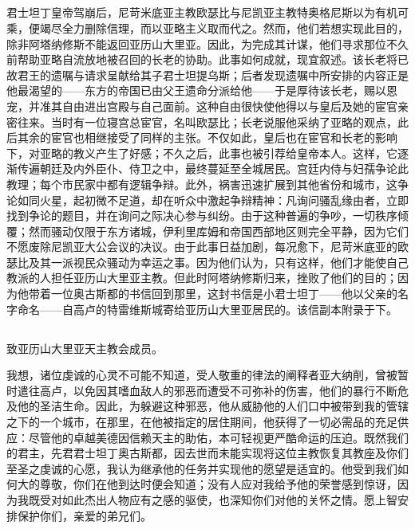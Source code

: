 
\subsection{}

君士坦丁皇帝驾崩后，尼苛米底亚主教欧瑟比与尼凯亚主教特奥格尼斯以为有机可乘，便竭尽全力删除信理，而以亚略主义取而代之。然而，他们若想实现此目的，除非阿塔纳修斯不能返回亚历山大里亚。因此，为完成其计谋，他们寻求那位不久前帮助亚略自流放地被召回的长老的协助。此事如何成就，现宜叙述。该长老将已故君王的遗嘱与请求呈献给其子君士坦提乌斯；后者发现遗嘱中所安排的内容正是他最渴望的——东方的帝国已由父王遗命分派给他——于是厚待该长老，赐以恩宠，并准其自由进出宫殿与自己面前。这种自由很快使他得以与皇后及她的宦官亲密往来。当时有一位寝宫总宦官，名叫欧瑟比；长老说服他采纳了亚略的观点，此后其余的宦官也相继接受了同样的主张。不仅如此，皇后也在宦官和长老的影响下，对亚略的教义产生了好感；不久之后，此事也被引荐给皇帝本人。这样，它逐渐传遍朝廷及内外臣仆、侍卫之中，最终蔓延至全城居民。宫廷内侍与妇孺争论此教理；每个市民家中都有逻辑争辩。此外，祸害迅速扩展到其他省份和城市，这争论如同火星，起初微不足道，却在听众中激起争辩精神：凡询问骚乱缘由者，立即找到争论的题目，并在询问之际决心参与纠纷。由于这种普遍的争吵，一切秩序倾覆；然而骚动仅限于东方诸城，伊利里库姆和帝国西部地区则完全平静，因为它们不愿废除尼凯亚大公会议的决议。由于此事日益加剧，每况愈下，尼苛米底亚的欧瑟比及其一派视民众骚动为幸运之事。因为他们认为，只有这样，他们才能使自己教派的人担任亚历山大里亚主教。但此时阿塔纳修斯归来，挫败了他们的目的；因为他带着一位奥古斯都的书信回到那里，这封书信是小君士坦丁——他以父亲的名字命名——自高卢的特雷维斯城寄给亚历山大里亚居民的。该信副本附录于下。\par


\subsection{}

致亚历山大里亚天主教会成员。\par

我想，诸位虔诚的心灵不可能不知道，受人敬重的律法的阐释者亚大纳削，曾被暂时遣往高卢，以免因其嗜血敌人的邪恶而遭受不可弥补的伤害，他们的暴行不断危及他的圣洁生命。因此，为躲避这种邪恶，他从威胁他的人们口中被带到我的管辖之下的一个城市，在那里，在他被指定的居住期间，他获得了一切必需品的充足供应：尽管他的卓越美德因信赖天主的助佑，本可轻视更严酷命运的压迫。既然我们的君主，先君君士坦丁奥古斯都，因去世而未能实现将这位主教恢复其教座及你们至圣之虔诚的心愿，我认为继承他的任务并实现他的愿望是适宜的。他受到我们如何大的尊敬，你们在他到达时便会知道；没有人应对我给予他的荣誉感到惊讶，因为我既受对如此杰出人物应有之感的驱使，也深知你们对他的关怀之情。愿上智安排保护你们，亲爱的弟兄们。\par

